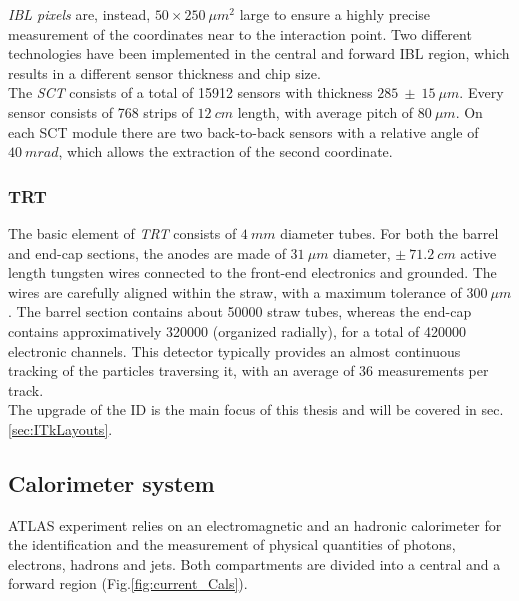 \documentclass[a4paper,twoside,12pt]{article}
\begin{document}
\textit{IBL pixels} are, instead, $50 \times 250\ \mu m^2$ large to 
ensure a highly precise measurement of the coordinates near to the interaction point\cite{IBL}. Two 
different technologies have been implemented in the central and forward IBL region, which
results in a different sensor thickness and chip size.\\

The \textit{SCT} consists of a total of 15912 sensors with thickness $285\ \pm\ 15\ \mu m$. Every sensor consists of 768 strips of $12\ cm$ length, with average pitch of $80\ \mu m$.
On each SCT module there are two back-to-back sensors with a relative angle of $40\ mrad$,
which allows the extraction of the second coordinate.

\subsubsection*{TRT}
The basic element of \textit{TRT} consists of $4\ mm$ diameter tubes\cite{Aad:2008zzm}. For both the barrel
and end-cap sections, the anodes are made of $31\ \mu m$ diameter, $\pm\ 71.2\ cm$ 
active length tungsten wires 
connected to the front-end electronics and grounded. The wires are carefully aligned within
the straw, with a maximum tolerance of $300\ \mu m$. The barrel section contains about 
50000 straw tubes, whereas the end-cap contains approximatively 320000 (organized radially),
for a total of 420000 electronic channels\cite{ATLAS:1997ag}. This detector typically provides
an almost continuous tracking of the particles traversing it, with an average of 36 measurements per track.\\

\bigskip
The upgrade of the ID is the main focus of this thesis and will be covered in sec.\ref{sec:ITkLayouts}.


\subsection{Calorimeter system}

ATLAS experiment  relies on an electromagnetic and an hadronic calorimeter for the identification and the measurement of physical quantities of photons, electrons, hadrons and jets. 
Both compartments are divided into a central and a forward region (Fig.\ref{fig:current_Cals}).
\end{document}
